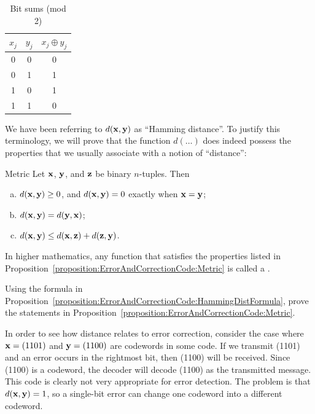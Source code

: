 \begin{table}[htb]
\caption{Bit sums (mod 2)}{\small
\begin{center}
\begin{tabular}{c c c }
\hline
 $x_j$ & $y_j$ & $x_j \oplus y_j$\\  [0.5ex]
 \hline
0 & 0 & 0\\
0 & 1 & 1\\
1 & 0 & 1\\
1 & 1 & 0\\
\hline
\end{tabular}
\label{algcodes:table3}
\end{center}
}
\end{table}
 
We have been referring to $d( {\bold x}, {\bold y})$ as ``Hamming distance''. To justify this terminology, we will prove that the function $d(\ldots)$ does indeed possess the properties that we usually associate with a notion of ``distance'': 
 
\begin{prop}{Metric}
Let ${\bold x}$, ${\bold y}$, and ${\bold z}$ be binary $n$-tuples.
Then 
\begin{enumerate}[(a)]
\item
$d( {\bold x}, {\bold y}) \geq 0$, and 
$d( {\bold x}, {\bold y}) = 0$ exactly when ${\bold x} = {\bold y}$; 
 
\item
$d( {\bold x}, {\bold y})= d( {\bold y}, {\bold x})$; 
 
\item
$d( {\bold x}, {\bold y}) \leq d( {\bold x}, {\bold z}) + d( {\bold
z}, {\bold y})$. 
 
\end{enumerate}
\end{prop}

In higher mathematics, any function that satisfies the properties listed in Proposition~\ref{proposition:ErrorAndCorrectionCode:Metric} is called a .

 \begin{exercise}{}
 Using the formula in Proposition~\ref{proposition:ErrorAndCorrectionCode:HammingDistFormula}, prove the statements in Proposition~\ref{proposition:ErrorAndCorrectionCode:Metric}.
 \end{exercise}
In order to see how distance relates to error correction, consider the case where ${\bold x} = (1101)$ and ${\bold y} = (1100)$ are
codewords in some code. If we transmit (1101) and an error occurs in
the rightmost bit, then (1100) will be received. Since (1100) is a
codeword, the decoder will decode (1100) as the transmitted message.
This code is clearly not very appropriate for error detection. The
problem is that $d({\bold x}, {\bold y}) = 1$, so a single-bit error can change one codeword into a different codeword. 


